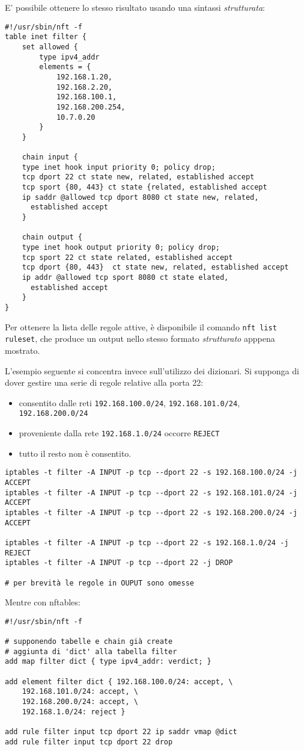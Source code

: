 E' possibile ottenere lo stesso risultato usando una sintassi \textit{strutturata}:
\begin{verbatim}
#!/usr/sbin/nft -f
table inet filter {
	set allowed {
		type ipv4_addr
		elements = {
			192.168.1.20,
			192.168.2.20,
			192.168.100.1,
			192.168.200.254,
			10.7.0.20
		}
	}
		
	chain input {
    type inet hook input priority 0; policy drop;
    tcp dport 22 ct state new, related, established accept
    tcp sport {80, 443} ct state {related, established accept
    ip saddr @allowed tcp dport 8080 ct state new, related,
      established accept
	}
			
	chain output {
    type inet hook output priority 0; policy drop;
    tcp sport 22 ct state related, established accept
    tcp dport {80, 443}  ct state new, related, established accept
    ip addr @allowed tcp sport 8080 ct state elated,
      established accept
	}
}
	\end{verbatim}
	Per ottenere la lista delle regole attive, è disponibile il comando
	\texttt{nft list ruleset}, che produce un output nello stesso formato \textit{strutturato}
	apppena mostrato.
	
	L'esempio seguente si concentra invece sull'utilizzo dei dizionari.
	Si supponga di dover gestire una serie di regole relative alla porta 22:
	\begin{itemize}
		\item consentito dalle reti \texttt{192.168.100.0/24}, \texttt{192.168.101.0/24},
		      \texttt{192.168.200.0/24}
		\item proveniente dalla rete \texttt{192.168.1.0/24} occorre \texttt{REJECT}
		\item tutto il resto non è consentito.
	\end{itemize}
\begin{verbatim}
iptables -t filter -A INPUT -p tcp --dport 22 -s 192.168.100.0/24 -j ACCEPT
iptables -t filter -A INPUT -p tcp --dport 22 -s 192.168.101.0/24 -j ACCEPT
iptables -t filter -A INPUT -p tcp --dport 22 -s 192.168.200.0/24 -j ACCEPT
		
iptables -t filter -A INPUT -p tcp --dport 22 -s 192.168.1.0/24 -j REJECT
iptables -t filter -A INPUT -p tcp --dport 22 -j DROP
		
# per brevità le regole in OUPUT sono omesse
\end{verbatim}
	Mentre con nftables:
\begin{verbatim}
#!/usr/sbin/nft -f
		
# supponendo tabelle e chain già create
# aggiunta di 'dict' alla tabella filter
add map filter dict { type ipv4_addr: verdict; }
		
add element filter dict { 192.168.100.0/24: accept, \
	192.168.101.0/24: accept, \
	192.168.200.0/24: accept, \
	192.168.1.0/24: reject }
		
add rule filter input tcp dport 22 ip saddr vmap @dict
add rule filter input tcp dport 22 drop
\end{verbatim}
